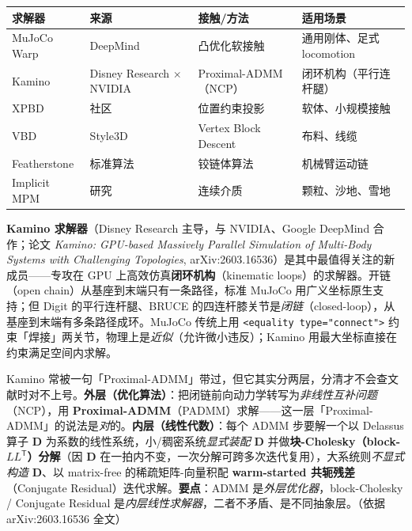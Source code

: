 \begin{center}
\small
\begin{tabular}{@{}llll@{}}
\toprule
求解器 & 来源 & 接触/方法 & 适用场景 \\
\midrule
MuJoCo Warp & DeepMind & 凸优化软接触 & 通用刚体、足式 locomotion \\
Kamino & Disney Research $\times$ NVIDIA & Proximal-ADMM（NCP） & 闭环机构（平行连杆腿） \\
XPBD & 社区 & 位置约束投影 & 软体、小规模接触 \\
VBD & Style3D & Vertex Block Descent & 布料、线缆 \\
Featherstone & 标准算法 & 铰链体算法 & 机械臂运动链 \\
Implicit MPM & 研究 & 连续介质 & 颗粒、沙地、雪地 \\
\bottomrule
\end{tabular}
\end{center}

\textbf{Kamino 求解器}（Disney Research 主导，与 NVIDIA、Google DeepMind 合作；论文 \emph{Kamino: GPU-based Massively Parallel Simulation of Multi-Body Systems with Challenging Topologies}, arXiv:2603.16536）\cite{kamino2026}是其中最值得关注的新成员——专攻在 GPU 上高效仿真\textbf{闭环机构}（kinematic loops）的求解器。开链（open chain）从基座到末端只有一条路径，标准 MuJoCo 用广义坐标原生支持；但 Digit 的平行连杆腿、BRUCE 的四连杆膝关节是\emph{闭链}（closed-loop），从基座到末端有多条路径成环。MuJoCo 传统上用 \verb|<equality type="connect">| 约束「焊接」两关节，物理上是\emph{近似}（允许微小违反）；Kamino 用最大坐标直接在约束满足空间内求解。

\begin{note}
Kamino 常被一句「Proximal-ADMM」带过，但它其实分两层，分清才不会查文献时对不上号。\textbf{外层（优化算法）}：把闭链前向动力学转写为\emph{非线性互补问题}（NCP），用 \textbf{Proximal-ADMM}（PADMM）求解——这一层「Proximal-ADMM」的说法是\emph{对}的。\textbf{内层（线性代数）}：每个 ADMM 步要解一个以 Delassus 算子 $\mathbf D$ 为系数的线性系统，小/稠密系统\emph{显式装配} $\mathbf D$ 并做\textbf{块-Cholesky（block-$LL^{\mathsf T}$）分解}（因 $\mathbf D$ 在一拍内不变，一次分解可跨多次迭代复用），大系统则\emph{不显式构造} $\mathbf D$、以 matrix-free 的稀疏矩阵-向量积配 \textbf{warm-started 共轭残差}（Conjugate Residual）迭代求解。\textbf{要点}：ADMM 是\emph{外层优化器}，block-Cholesky / Conjugate Residual 是\emph{内层线性求解器}，二者不矛盾、是不同抽象层。（依据 arXiv:2603.16536 全文）
\end{note}

